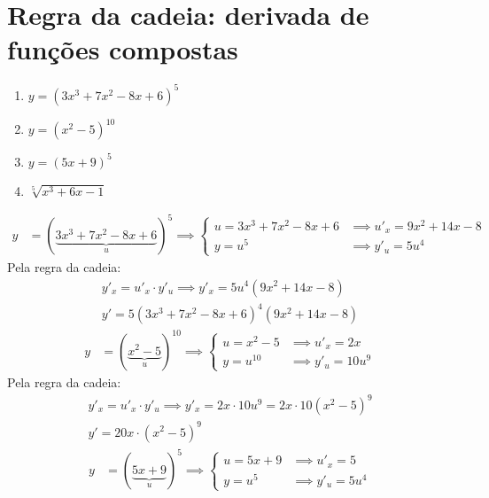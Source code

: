 \documentclass{jhwhw}
\begin{document}
\chapter{Regra da cadeia: derivada de funções compostas}
\begin{enumerate}
    \item $y = (3x^3 + 7x^2 - 8x + 6)^5$
    \item $y = (x^2 -5)^{10}$
    \item $y = (5x+9)^5$
    \item $\sqrt[5]{x^3 + 6x - 1}$
\end{enumerate}
\begin{align*}
    y &= (\underbrace{3x^3 + 7x^2 - 8x + 6}_{u})^5 \implies
    \begin{cases}
        u = 3x^3 + 7x^2 - 8x + 6 & \implies u\prime^{}_x = 9x^2 + 14x - 8\\
        y = u^5 & \implies y\prime^{}_u = 5u^4 
    \end{cases}
\end{align*}
Pela regra da cadeia:
\begin{multline*}
    y\prime^{}_x = u\prime^{}_x \cdot y\prime^{}_u \implies y\prime^{}_x = 5u^4(9x^2 + 14x - 8) \\ \boxed{y\prime = 5(3x^3 + 7x^2 - 8x + 6)^4(9x^2 + 14x - 8)}
\end{multline*}
\begin{align*}
    y & = (\underbrace{x^2 -5}_{u})^{10} \implies
    \begin{cases}
        u = x^2 -5 & \implies u\prime^{}_x = 2x \\
        y = u^{10} & \implies y\prime^{}_u = 10u^9
    \end{cases}
\end{align*}
Pela regra da cadeia:
\begin{multline*}
    y\prime^{}_x = u\prime^{}_x \cdot y\prime^{}_u \implies y\prime^{}_x = 2x \cdot 10u^9 = 2x \cdot 10(x^2-5)^9 \\ \boxed{y\prime = 20x\cdot(x^2-5)^9}
\end{multline*}
\begin{align*}
    y & = (\underbrace{5x+9}_{u})^{5} \implies
    \begin{cases}
        u = 5x+9 & \implies u\prime^{}_x = 5 \\
        y = u^{5} & \implies y\prime^{}_u = 5u^4
    \end{cases}
\end{align*}
\end{document}
